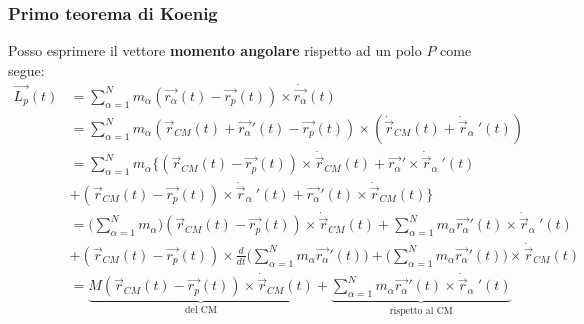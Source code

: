\subsubsection{Primo teorema di Koenig} Posso esprimere il vettore \textbf{momento angolare} rispetto ad un polo $P$ come segue:
\begin{equation}
	\label{eq:koenig1}
	\begin{split}
		\vec{L_p}(t) & = \sum_{\alpha=1}^N m_\alpha(\vec{r_\alpha}(t) - \vec{r_p}(t)) \times \dot{\vec{r_\alpha}}(t) \\
		& = \sum_{\alpha=1}^N m_\alpha (\vec{r}_{CM}(t) + \vec{r_\alpha}'(t) - \vec{r_p}(t)) \times (\dot{\vec{r}}_{CM}(t) + \dot{\vec{r}}_\alpha \:'(t)) \\
		& = \sum_{\alpha=1}^N m_\alpha \{(\vec{r}_{CM}(t) - \vec{r_p}(t)) \times \dot{\vec{r}}_{CM}(t) + \vec{r_\alpha}' \times \dot{\vec{r}}_\alpha \: '(t) \\
		& + (\vec{r}_{CM}(t) - \vec{r_p}(t)) \times \dot{\vec{r}}_\alpha\:'(t) + \vec{r_\alpha}'(t) \times \dot{\vec{r}}_{CM}(t)\} \\
		& = \bigg(\sum_{\alpha=1}^N m_\alpha\bigg) (\vec{r}_{CM}(t)-\vec{r_p}(t)) \times \dot{\vec{r}}_{CM}(t) + \sum_{\alpha=1}^N m_\alpha\vec{r_\alpha}'(t)\times \dot{\vec{r}}_\alpha \:'(t) \\
		& + (\vec{r}_{CM}(t) - \vec{r_p}(t)) \times \frac{d}{dt}\bigg(\sum_{\alpha=1}^N m_\alpha \vec{r_\alpha}'(t)\bigg) + \bigg(\sum_{\alpha=1}^N m_\alpha \vec{r_\alpha}'(t)\bigg) \times \dot{\vec{r}}_{CM}(t) \\
		& = \underbrace{M(\vec{r}_{CM}(t) - \vec{r_p}(t)) \times \dot{\vec{r}}_{CM}(t)}_{\text{del CM}} + \underbrace{\sum_{\alpha=1}^N m_\alpha \vec{r_\alpha}'(t) \times \dot{\vec{r}}_\alpha\:'(t)}_{\text{rispetto al CM}}
	\end{split}
\end{equation}
